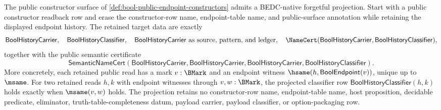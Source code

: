 \begin{lemma}
\label{lem:bool-public-endpoint-forgetful-projection-boundary}
The public constructor surface of \autoref{def:bool-public-endpoint-constructors} admits a BEDC-native forgetful projection. Start with a public constructor readback row and erase the constructor-row name, endpoint-table name, and public-surface annotation while retaining the displayed endpoint history. The retained target data are exactly
$$
\mathsf{BoolHistoryCarrier},\quad
\mathsf{BoolHistoryClassifier},\quad
\mathsf{BoolHistoryCarrier}\text{ as source, pattern, and ledger},\quad
\NameCert(\mathsf{BoolHistoryCarrier},\mathsf{BoolHistoryClassifier}),
$$
together with the public semantic certificate
$$
\mathsf{SemanticNameCert}(\mathsf{BoolHistoryCarrier},\mathsf{BoolHistoryCarrier},
\mathsf{BoolHistoryCarrier},\mathsf{BoolHistoryClassifier}).
$$
More concretely, each retained public read has a mark $v:\BMark$ and an endpoint witness $\hsame(h,\mathsf{BoolEndpoint}(v))$, unique up to $\msame$. For two retained reads $h,k$ with endpoint witnesses through $v,w:\BMark$, the projected classifier row $\mathsf{BoolHistoryClassifier}(h,k)$ holds exactly when $\msame(v,w)$ holds. The projection retains no constructor-row name, endpoint-table name, host proposition, decidable predicate, eliminator, truth-table-completeness datum, payload carrier, payload classifier, or option-packaging row.
\end{lemma}
